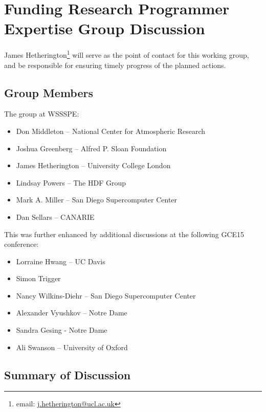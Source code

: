 \section{Funding Research Programmer Expertise Group Discussion}
\label{sec:appendix_funding_spec_expert}

James Hetherington\footnote{email: \href{mailto:j.hetherington@ucl.ac.uk}{j.hetherington@ucl.ac.uk}}
will serve as the point of contact for this working group, and be responsible for ensuring timely progress of the planned actions.

\subsection{Group Members}

The group at WSSSPE:

\begin{itemize}
\item Don Middleton -- National Center for Atmospheric Research
\item Joshua Greenberg -- Alfred P. Sloan Foundation
\item James Hetherington -- University College London
\item Lindsay Powers -- The HDF Group
\item Mark A. Miller -- San Diego Supercomputer Center
\item Dan Sellars -- CANARIE
\end{itemize}

This was further enhanced by additional discussions at the following
GCE15 conference:
  
\begin{itemize}
\item Lorraine Hwang -- UC Davis
\item Simon Trigger
\item Nancy Wilkins-Diehr -- San Diego Supercomputer Center
\item Alexander Vyushkov -- Notre Dame
\item Sandra Gesing - Notre Dame
\item Ali Swanson -- University of Oxford

\end{itemize}

\subsection{Summary of Discussion}

